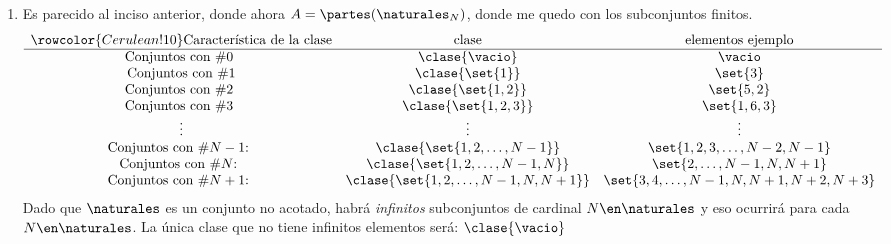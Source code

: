 \begin{enumerate}[label=\roman*)]
  \item
        Es parecido al inciso anterior, donde ahora $A = \partes(\naturales_N)$, donde me quedo con los subconjuntos finitos.
        $$
          \begin{array}{ccc}
            \rowcolor{Cerulean!10}
            \text{Característica de la clase} & \text{clase}                              & \text{elementos ejemplo}                  \\ \hline
            \text{Conjuntos con \#0 }         & \clase{\vacio}                            & \vacio                                    \\
            \text{Conjuntos con \#1}          & \clase{\set{1}}                           & \set{3}                                   \\
            \text{Conjuntos con \#2 }         & \clase{\set{1,2}}                         & \set{5,2}                                 \\
            \text{Conjuntos con \#3 }         & \clase{\set{1,2,3}}                       & \set{1,6,3}                               \\
            \vdots                            & \vdots                                    & \vdots                                    \\
            \text{Conjuntos con \#$N-1$: }    & \clase{\set{1, 2, \ldots, N-1}}           & \set{1, 2, 3, \ldots,N-2, N-1}            \\
            \text{Conjuntos con \#$N$: }      & \clase{\set{1, 2, \ldots, N-1, N}}        & \set{2, \ldots, N-1,N, N+1}               \\
            \text{Conjuntos con \#$N+1$: }    & \clase{\set{1, 2, \ldots, N-1, N, N + 1}} & \set{3, 4, \ldots, N-1, N, N+1, N+2, N+3} \\
          \end{array}
        $$
        Dado que $\naturales$ es un conjunto no acotado, habrá \textit{infinitos} subconjuntos de cardinal $N \en \naturales$ y
        eso ocurrirá para cada $N \en \naturales$.
        La única clase que no tiene infinitos elementos será: $\clase{\vacio}$
\end{enumerate}

\begin{aportes}
  \item {}
  \item {}
\end{aportes}
